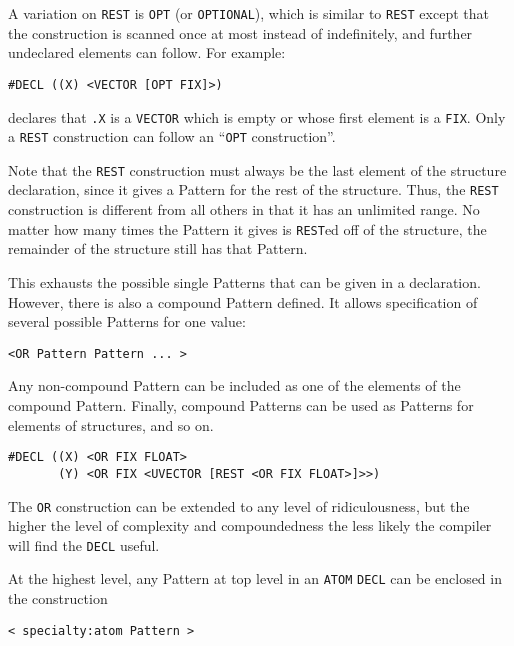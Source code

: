 \documentclass[a4paper]{scrbook}
\begin{document}
A variation on \texttt{REST} is \texttt{OPT}  (or
\texttt{OPTIONAL}), which is similar to \texttt{REST} except that the construction is
scanned once at most instead of indefinitely, and further undeclared elements can follow. For example:

\begin{verbatim}
#DECL ((X) <VECTOR [OPT FIX]>)
\end{verbatim}

declares that \texttt{.X} is a \texttt{VECTOR} which is empty or whose first element is a \texttt{FIX}. Only a
\texttt{REST} construction can follow an ``\texttt{OPT} construction''.

Note that the \texttt{REST} construction must always be the last element of the structure declaration, since it gives a
Pattern for the rest of the structure. Thus, the \texttt{REST} construction is different from all others in that it has an
unlimited range. No matter how many times the Pattern it gives is \texttt{REST}ed off of the structure, the remainder of
the structure still has that Pattern.

This exhausts the possible single Patterns that can be given in a declaration. However, there is also a compound Pattern
defined. It allows specification of several possible Patterns for one value:

\begin{verbatim}
<OR Pattern Pattern ... >
\end{verbatim}

Any non-compound Pattern can be included as one of the elements of the compound Pattern. Finally, compound Patterns can be
used as Patterns for elements of structures, and so on.

\begin{verbatim}
#DECL ((X) <OR FIX FLOAT>
       (Y) <OR FIX <UVECTOR [REST <OR FIX FLOAT>]>>)
\end{verbatim}

The \texttt{OR} construction can be extended to any level of ridiculousness, but the higher the level of complexity and
compoundedness the less likely the compiler will find the \texttt{DECL} useful.

At the highest level, any Pattern at top level in an \texttt{ATOM} \texttt{DECL} can be enclosed in the construction

\begin{verbatim}
< specialty:atom Pattern >
\end{verbatim}
\end{document}
